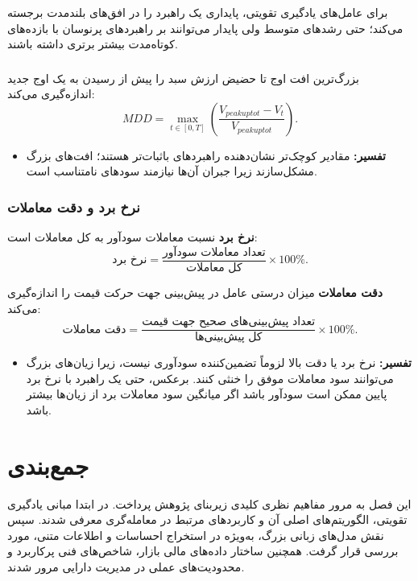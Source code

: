 \documentclass[12pt, a4paper]{report}
\begin{document}
برای عامل‌های یادگیری تقویتی،  پایداری یک راهبرد را در افق‌های بلندمدت برجسته می‌کند؛ حتی رشدهای متوسط ولی پایدار می‌توانند بر راهبردهای پرنوسان با بازده‌های کوتاه‌مدت بیشتر برتری داشته باشند.  

\subsubsection{}


 بزرگ‌ترین افت اوج تا حضیض ارزش سبد را پیش از رسیدن به یک اوج جدید اندازه‌گیری می‌کند:
\[
MDD = \max_{t \in [0,T]} \left( \frac{V_{peak up to t} - V_t}{V_{peak up to t}} \right).
\]

\begin{itemize}
    \item \textbf{تفسیر:} مقادیر کوچک‌تر  نشان‌دهنده راهبردهای باثبات‌تر هستند؛ افت‌های بزرگ مشکل‌سازند زیرا جبران آن‌ها نیازمند سودهای نامتناسب است.  
\end{itemize}


\subsubsection{نرخ برد\protect\footnotemark \; و دقت معاملات\protect\footnotemark}

\textbf{نرخ برد} نسبت معاملات سودآور به کل معاملات است:
\[
\text{نرخ برد} = \frac{\text{تعداد معاملات سودآور}}{\text{کل معاملات}} \times 100\%.
\]

\textbf{دقت معاملات} میزان درستی عامل در پیش‌بینی جهت حرکت قیمت را اندازه‌گیری می‌کند:
\[
\text{دقت معاملات} = \frac{\text{تعداد پیش‌بینی‌های صحیح جهت قیمت}}{\text{کل پیش‌بینی‌ها}} \times 100\%.
\]

\begin{itemize}
    \item \textbf{تفسیر:} نرخ برد یا دقت بالا لزوماً تضمین‌کننده سودآوری نیست، زیرا زیان‌های بزرگ می‌توانند سود معاملات موفق را خنثی کنند. برعکس، حتی یک راهبرد با نرخ برد پایین ممکن است سودآور باشد اگر میانگین سود معاملات برد از زیان‌ها بیشتر باشد.  
\end{itemize}


\section{جمع‌بندی}

این فصل به مرور مفاهیم نظری کلیدی زیربنای پژوهش پرداخت. در ابتدا مبانی یادگیری تقویتی، الگوریتم‌های اصلی آن و کاربردهای مرتبط در معامله‌گری معرفی شدند. سپس نقش مدل‌های زبانی بزرگ، به‌ویژه در استخراج احساسات و اطلاعات متنی، مورد بررسی قرار گرفت. همچنین ساختار داده‌های مالی بازار، شاخص‌های فنی پرکاربرد و محدودیت‌های عملی در مدیریت دارایی مرور شدند. 
\end{document}
